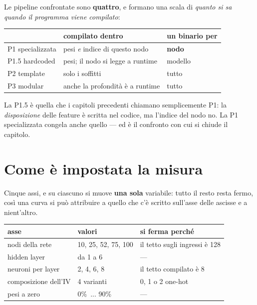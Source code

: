 \documentclass[11pt,a4paper,oneside]{report}
\begin{document}
Le pipeline confrontate sono \textbf{quattro}, e formano una scala di
\emph{quanto si sa quando il programma viene compilato}:

\begin{center}
\small
\begin{tabular}{@{}lll@{}}
\toprule
& \textbf{compilato dentro} & \textbf{un binario per} \\
\midrule
P1 specializzata & pesi \emph{e} indice di questo nodo & \textbf{nodo} \\
P1.5 hardcoded   & pesi; il nodo si legge a runtime   & modello \\
P2 template      & solo i soffitti                    & tutto \\
P3 modular       & anche la profondità è a runtime    & tutto \\
\bottomrule
\end{tabular}
\end{center}

La P1.5 è quella che i capitoli precedenti chiamano semplicemente P1: la
\emph{disposizione} delle feature è scritta nel codice, ma l'indice del nodo no.
La P1 specializzata congela anche quello --- ed è il confronto con cui si chiude
il capitolo.

\section{Come è impostata la misura}

Cinque assi, e su ciascuno si muove \textbf{una sola} variabile: tutto il resto
resta fermo, così una curva si può attribuire a quello che c'è scritto sull'asse
delle ascisse e a nient'altro.

\begin{center}
\small
\begin{tabular}{@{}lll@{}}
\toprule
\textbf{asse} & \textbf{valori} & \textbf{si ferma perché} \\
\midrule
nodi della rete    & 10, 25, 52, 75, 100 & il tetto sugli ingressi è 128 \\
hidden layer       & da 1 a 6            & --- \\
neuroni per layer  & 2, 4, 6, 8          & il tetto compilato è 8 \\
composizione dell'IV & 4 varianti        & 0, 1 o 2 one-hot \\
pesi a zero        & 0\%\ ... 90\%       & --- \\
\bottomrule
\end{tabular}
\end{center}
\end{document}
